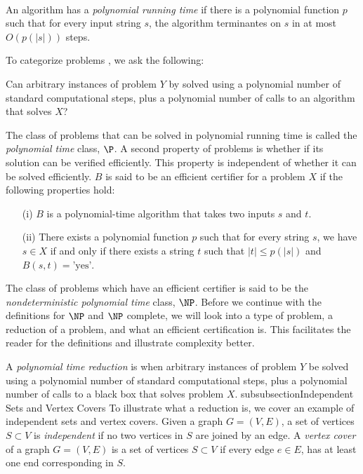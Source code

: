 \


An algorithm has a \textit{polynomial running time} if there is a polynomial function $p$ such that 
for every input string $s$, the algorithm terminantes on $s$ in at most $O\left( p \left( \left\vert 
s \right\vert\right)\right)$ steps.  

To categorize problems \cite{kleinberg2006algorithm}, we ask the following:
\begin{prob}
Can arbitrary instances of problem $Y$ by solved using a polynomial number of standard computational steps, plus a polynomial number of calls to an algorithm that solves $X$?
\end{prob}
The class of problems that can be solved in polynomial running time is called the \textit{polynomial time} class, $\P$.  A second property of problems is whether if its solution can be verified efficiently.  This property is independent of whether it can be solved efficiently.  $B$ is said to be an efficient certifier for a problem $X$  if the following properties hold:
\begin{itemize}
\item[(i)] $B$ is a polynomial-time algorithm that takes two inputs $s$ and $t$.
\item[(ii)] There exists a polynomial function $p$ such that for every string $s$, we have $s \in X$ if and only if there exists a string $t$ such that $\vert t \vert \leq p\left( \vert s \vert \right)$ and $B(s,t) = \text{'yes'}$.
\end{itemize}

The class of problems which have an efficient certifier is said to be the \textit{nondeterministic 
polynomial time} class, $\NP$. Before we continue with the definitions for $\NP$ and $\NP$ 
complete, we will look into a type of problem, a reduction of a problem, and what an efficient 
certification is.  This facilitates the reader for the definitions and illustrate complexity better. 
 
A \textit{polynomial time reduction} is when arbitrary instances of problem $Y$ be solved using a polynomial number of standard computational steps, plus a polynomial number of calls to a black box that solves problem $X$.
subsubsection{Independent Sets and Vertex Covers}
To illustrate what a reduction is, we cover an example of independent sets and vertex covers.  
Given a graph $G = (V,E)$, a set of vertices $S \subset V$ is \textit{independent} if no two 
vertices in $S$ are joined by an edge. A \textit{vertex cover} of a graph $G = (V,E)$  is a set of 
vertices $S \subset V$ if every edge $e \in E$, has at least one end corresponding in $S$.


